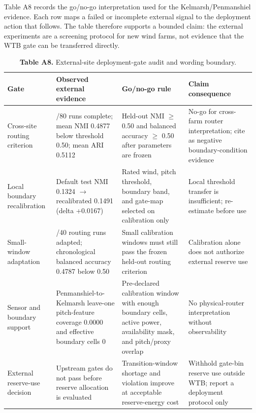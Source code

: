 \documentclass[
  11pt]{article}
\begin{document}
Table A8 records the go/no-go interpretation used for the
Kelmarsh/Penmanshiel evidence. Each row maps a failed or incomplete
external signal to the deployment action that follows. The table
therefore supports a bounded claim: the external experiments are a
screening protocol for new wind farms, not evidence that the WTB gate
can be transferred directly.

\begin{table}[H]
\centering
\scriptsize
\setlength{\tabcolsep}{2.2pt}
\renewcommand{\arraystretch}{1.08}
\caption*{\textbf{Table A8.} External-site deployment-gate audit and wording boundary.}
\begin{tabularx}{\columnwidth}{>{\raggedright\arraybackslash}p{} >{\raggedright\arraybackslash}p{} >{\raggedright\arraybackslash}p{} >{\raggedright\arraybackslash}X}
\toprule
Gate & Observed external evidence & Go/no-go rule & Claim consequence \\
\midrule
Cross-site routing criterion & 80/80 runs complete; mean NMI 0.4877 below threshold 0.50; mean ARI 0.5112 & Held-out NMI $\geq$ 0.50 and balanced accuracy $\geq$ 0.50 after parameters are frozen & No-go for cross-farm router interpretation; cite as negative boundary-condition evidence \\
Local boundary recalibration & Default test NMI 0.1324 $\rightarrow$ recalibrated 0.1491 (delta +0.0167) & Rated wind, pitch threshold, boundary band, and gate-map selected on calibration only & Local threshold transfer is insufficient; re-estimate before use \\
Small-window adaptation & 40/40 routing runs adapted; chronological balanced accuracy 0.4787 below 0.50 & Small calibration windows must still pass the frozen held-out routing criterion & Calibration alone does not authorize external reserve use \\
Sensor and boundary support & Penmanshiel-to-Kelmarsh leave-one pitch-feature coverage 0.0000 and effective boundary cells 0 & Pre-declared calibration window with enough boundary cells, active power, availability mask, and pitch/proxy overlap & No physical-router interpretation without observability \\
External reserve-use decision & Upstream gates do not pass before reserve allocation is evaluated & Transition-window shortage and violation improve at acceptable reserve-energy cost & Withhold gate-bin reserve use outside WTB; report a deployment protocol only \\
\bottomrule
\end{tabularx}
\end{table}
\end{document}

